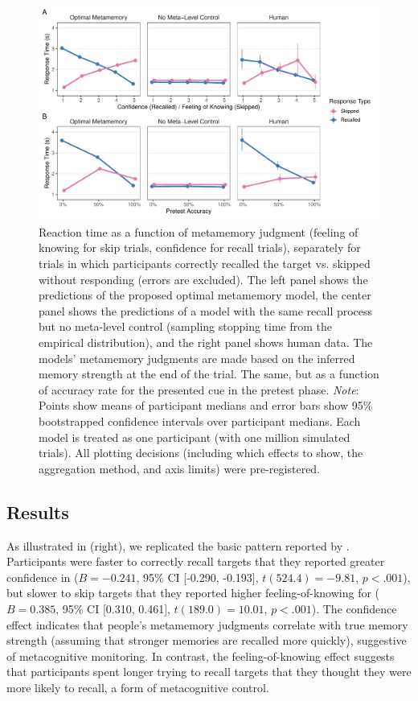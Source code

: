 \begin{figure}[t!]
  \includegraphics[scale=.65]{figs/memory/exp1/rt.pdf}
  \caption{%
     Reaction time as a function of metamemory judgment (feeling of knowing for skip trials, confidence for recall trials), separately for trials in which participants correctly recalled the target vs. skipped without responding (errors are excluded). The left panel shows the predictions of the proposed optimal metamemory model, the center panel shows the predictions of a model with the same recall process but no meta-level control (sampling stopping time from the empirical distribution), and the right panel shows human data. The models' metamemory judgments are made based on the inferred memory strength at the end of the trial.
     The same, but as a function of accuracy rate for the presented cue in the pretest phase. 
    \emph{Note}: Points show means of participant medians and error bars show 95\% bootstrapped confidence intervals over participant medians. Each model is treated as one participant (with one million simulated trials). All plotting decisions (including which effects to show, the aggregation method, and axis limits) were pre-registered.
  }
  \label{fig:exp1_rt}
\end{figure}

\subsection{Results}

As illustrated in  (right), we replicated the basic pattern reported by \citet{costermans1992confidence}. Participants were faster to correctly recall targets that they reported greater confidence in ($B = -0.241$, 95\% CI [-0.290, -0.193], $t(524.4)=-9.81$, $p < .001$), but slower to skip targets that they reported higher feeling-of-knowing for ($B = 0.385$, 95\% CI [0.310, 0.461], $t(189.0)=10.01$, $p < .001$). The confidence effect indicates that people's metamemory judgments correlate with true memory strength (assuming that stronger memories are recalled more quickly), suggestive of metacognitive monitoring. In contrast, the feeling-of-knowing effect suggests that participants spent longer trying to recall targets that they thought they were more likely to recall, a form of metacognitive control.

